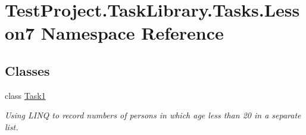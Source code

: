 \hypertarget{namespace_test_project_1_1_task_library_1_1_tasks_1_1_lesson7}{}\section{Test\+Project.\+Task\+Library.\+Tasks.\+Lesson7 Namespace Reference}
\label{namespace_test_project_1_1_task_library_1_1_tasks_1_1_lesson7}
\subsection*{Classes}
\begin{DoxyCompactItemize}
\item 
class \mbox{\hyperlink{class_test_project_1_1_task_library_1_1_tasks_1_1_lesson7_1_1_task1}{Task1}}
\begin{DoxyCompactList}\small\item\em Using L\+I\+NQ to record numbers of persons in which age less than 20 in a separate list. \end{DoxyCompactList}\end{DoxyCompactItemize}
